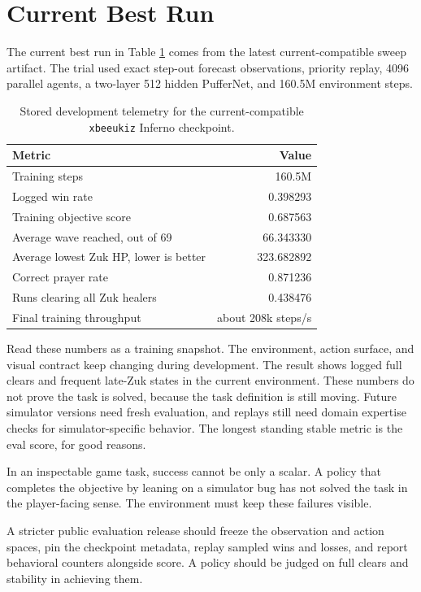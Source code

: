 \documentclass[10pt]{article}
\begin{document}
\section{Current Best Run}

The current best run in Table \ref{tab:result} comes from the latest current-compatible sweep artifact. The trial used exact step-out forecast observations, priority replay, 4096 parallel agents, a two-layer 512 hidden PufferNet, and 160.5M environment steps.

\begin{table}[H]
\centering
\small
\begin{tabular}{lr}
\toprule
Metric & Value \\
\midrule
Training steps & 160.5M \\
Logged win rate & 0.398293 \\
Training objective score & 0.687563 \\
Average wave reached, out of 69 & 66.343330 \\
Average lowest Zuk HP, lower is better & 323.682892 \\
Correct prayer rate & 0.871236 \\
Runs clearing all Zuk healers & 0.438476 \\
Final training throughput & about 208k steps/s \\
\bottomrule
\end{tabular}
\caption{Stored development telemetry for the current-compatible \texttt{xbeeukiz} Inferno checkpoint.}
\label{tab:result}
\end{table}

Read these numbers as a training snapshot. The environment, action surface, and visual contract keep changing during development. The result shows logged full clears and frequent late-Zuk states in the current environment. These numbers do not prove the task is solved, because the task definition is still moving. Future simulator versions need fresh evaluation, and replays still need domain expertise checks for simulator-specific behavior. The longest standing stable metric is the eval score, for good reasons.

In an inspectable game task, success cannot be only a scalar. A policy that completes the objective by leaning on a simulator bug has not solved the task in the player-facing sense. The environment must keep these failures visible.

A stricter public evaluation release should freeze the observation and action spaces, pin the checkpoint metadata, replay sampled wins and losses, and report behavioral counters alongside score. A policy should be judged on full clears and stability in achieving them.
\end{document}
